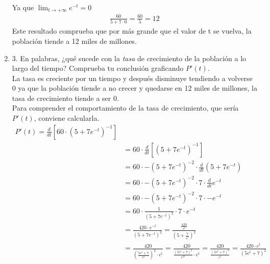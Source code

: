 \documentclass[12pt]{article}
\begin{document}
\begin{enumerate}
    Ya que $ \lim_{t \to +\infty} e^{-t} = 0$
    \[
    \begin{equation*}
  \begin{split}
     \frac{ 60}{ 5+ 7 \cdot 0} =  \frac{60}{5} = 12
        \end{split}
\end{equation*}
\]
Este resultado comprueba que por más grande que el valor de t se vuelva, la población tiende a 12 miles de millones.\\

\item3.  En palabras, ¿qué sucede con la \textit{tasa} de crecimiento de la población a lo largo del tiempo? Comprueba tu conclusión graficando $P'(t)$.\\
  La tasa es creciente por un tiempo y después disminuye tendiendo a volverse 0 ya que la población tiende a no crecer y quedarse en 12 miles de millones, la tasa de crecimiento tiende a ser 0.\\
 
       Para comprender el comportamiento de  la tasa de crecimiento, que sería $P'(t)$, conviene  calcularla.
\[ \begin{equation*}
  \begin{split}
    P'(t) = \frac{d}{dt} \left[ 60 \cdot (5+7e^{-t})^{-1}\right]\\
    &= 60 \cdot \frac{d}{dt}\left[(5+7e^{-t})^{-1}\right]\\
    &=  60 \cdot -(5+7e^{-t})^{-2} \cdot \frac{d}{dt} (5+7e^{-t}) \\
    &= 60 \cdot -(5+7e^{-t})^{-2} \cdot 7 \cdot  \frac{d}{dt}e^{-t}\\
    &= 60 \cdot -(5+7e^{-t})^{-2} \cdot 7 \cdot  -e^{-t} \\
    &= 60 \cdot \frac {1}{(5+7e^{-t})^{2}} \cdot 7 \cdot  e^{-t}\\
    &=  \frac {420 \cdot  e^{-t}}  {(5+7e^{-t})^{2}} =  \frac {\frac{420}{e^{t}}}  {(5+\frac{7}{e^{t}})^{2}}\\
    &=  \frac {420}  {(\frac{5e^{t}+7}{e^{t}})^{2} \cdot e^{t}} = \frac {420}  {\frac{(5e^{t}+7)^{2}}{e^{2t}} \cdot e^{t}} =
    \frac {420}{\frac{(5e^{t}+7)^{2}}{e^{t}}} =  \frac {420\cdot e^{t}}{(5e^{t}+7)^{2}}
     \end{split}
\end{equation*} \]


\end{enumerate}
\end{document}
